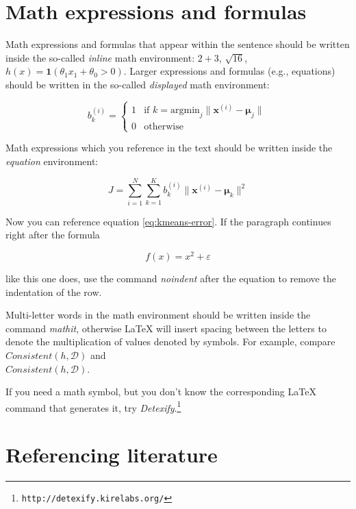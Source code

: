 \documentclass[10pt, a4paper]{article}
\begin{document}
\section{Math expressions and formulas}

Math expressions and formulas that appear within the sentence should be written inside the so-called \emph{inline} math environment: $2+3$, $\sqrt{16}$, $h(x)=\mathbf{1}(\theta_1 x_1 + \theta_0>0)$. Larger expressions and formulas (e.g., equations) should be written in the so-called \emph{displayed} math environment:

\[
b^{(i)}_k = \begin{cases}
1 & \text{if 
    $k = \text{argmin}_j \| \mathbf{x}^{(i)} - \mathbf{\mu}_j \|$}\\
0 & \text{otherwise}
\end{cases}
\]

Math expressions which you reference in the text should be written inside the \textit{equation} environment:

\begin{equation}\label{eq:kmeans-error}
J = \sum_{i=1}^N \sum_{k=1}^K 
b^{(i)}_k \| \mathbf{x}^{(i)} - \mathbf{\mu}_k \|^2
\end{equation}

Now you can reference equation \eqref{eq:kmeans-error}. If the paragraph continues right after the formula

\begin{equation}
f(x) = x^2 + \varepsilon
\end{equation}

\noindent like this one does, use the command \emph{noindent} after the equation to remove the indentation of the row. 

Multi-letter words in the math environment should be written inside the command \emph{mathit}, otherwise \LaTeX{} will insert spacing between the letters to denote the multiplication of values denoted by symbols. For example, compare
$\mathit{Consistent}(h,\mathcal{D})$ and\\
$Consistent(h,\mathcal{D})$.

If you need a math symbol, but you don't know the corresponding \LaTeX{} command that generates it, try
\emph{Detexify}.\footnote{\texttt{http://detexify.kirelabs.org/}}

\section{Referencing literature}
\end{document}
